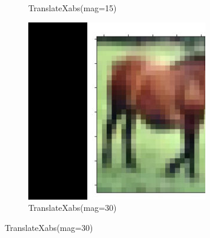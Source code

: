\documentclass[onecolumn]{ujarticle}   %
\begin{document}
\begin{figure}[h]
\begin{subfigure}{0.3\columnwidth}
        \caption{TranslateXabs(mag=15)}
        \label{fig:TranslateXabs_15}
      \end{subfigure}
      \begin{subfigure}{0.3\columnwidth}
        \centering
        \includegraphics[width=1.0\columnwidth]{transform_test/TranslateXabs_30.png}
        \caption{TranslateXabs(mag=30)}
        \label{fig:TranslateXabs_30}
      \end{subfigure}


\end{figure}
\end{document}
